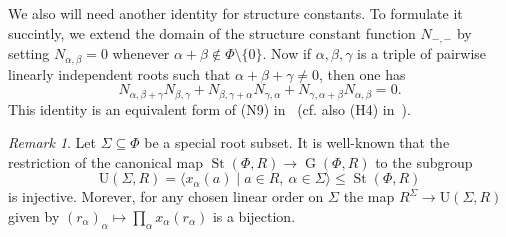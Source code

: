 \documentclass{article}
\numberwithin{equation}{section}
\theoremstyle{definition}
\theoremstyle{remark}
\newtheorem{rem}[lemma]{Remark}
\DeclareMathOperator\St{St}
\DeclareMathOperator\GG{G}
\begin{document}
We also will need another identity for structure constants.
To formulate it succintly, we extend the domain of the structure constant function $N_{-,-}$ by setting $N_{\alpha, \beta} = 0$ whenever $\alpha+\beta\not\in\Phi\setminus\{0\}$.
Now if $\alpha, \beta, \gamma$ is a triple of pairwise linearly independent roots such that $\alpha+\beta+\gamma\neq 0$, then one has 
\begin{equation}\label{eq:cocycle2} N_{\alpha,\beta+\gamma} N_{\beta,\gamma} + N_{\beta,\gamma+\alpha} N_{\gamma,\alpha} + N_{\gamma,\alpha+\beta}N_{\alpha,\beta} = 0. \end{equation}
This identity is an equivalent form of (N9) in~\cite[\S~14]{VP} (cf. also (H4) in~\cite{Re75}).

\begin{rem}\label{rem:uni-rad}
Let $\Sigma \subseteq \Phi$ be a special root subset. It is well-known that the restriction of the canonical map $\St(\Phi, R)\to\GG(\Phi, R)$ to the subgroup \[\mathrm{U}(\Sigma, R) = \langle x_{\alpha}(a) \mid a\in R,\ \alpha\in \Sigma \rangle \leq \St(\Phi, R)\] is injective. Morever, for any chosen linear order on \(\Sigma\) the map $R^{\Sigma} \to \mathrm{U}(\Sigma, R)$ given by $(r_\alpha)_\alpha \mapsto \prod_\alpha x_\alpha(r_\alpha)$ is a bijection. \end{rem}
\end{document}
